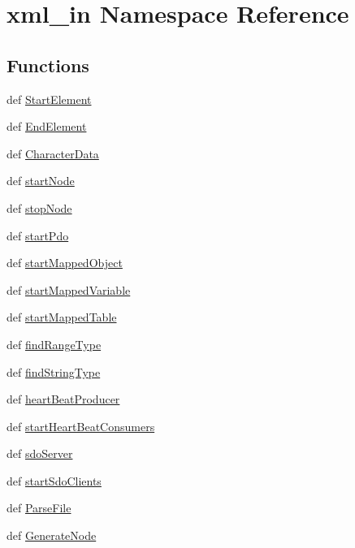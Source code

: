 \hypertarget{namespacexml__in}{
\section{xml\_\-in Namespace Reference}
\label{namespacexml__in}
}


\subsection*{Functions}
\begin{CompactItemize}
\item 
def \hyperlink{namespacexml__in_3b1b832c9581208c332a83f106015aff}{Start\-Element}
\item 
def \hyperlink{namespacexml__in_152ef8abb29428e5a4f6883d0b9c1036}{End\-Element}
\item 
def \hyperlink{namespacexml__in_40875b2bc42a3db80aaedc214f8da3d7}{Character\-Data}
\item 
def \hyperlink{namespacexml__in_170b4feee4419d719dec07845bd6f591}{start\-Node}
\item 
def \hyperlink{namespacexml__in_14f6a38437b8d44f75a7838414f926f8}{stop\-Node}
\item 
def \hyperlink{namespacexml__in_05f630ab0531cab1ef4649ca8b6a662f}{start\-Pdo}
\item 
def \hyperlink{namespacexml__in_c590c2898e7e2c81fb741dded42e9139}{start\-Mapped\-Object}
\item 
def \hyperlink{namespacexml__in_df5fbbfd3c5f6bbe0205f2926dc443d1}{start\-Mapped\-Variable}
\item 
def \hyperlink{namespacexml__in_cab6ba5f6bd741bbe97aa9d1af78194f}{start\-Mapped\-Table}
\item 
def \hyperlink{namespacexml__in_826fcdb3b500cd56bccd4290f39397d9}{find\-Range\-Type}
\item 
def \hyperlink{namespacexml__in_7f11bfdc69b5c39650c9edf1ab83b08b}{find\-String\-Type}
\item 
def \hyperlink{namespacexml__in_9ef42f4525a33b7fad6bf277f5f90e8b}{heart\-Beat\-Producer}
\item 
def \hyperlink{namespacexml__in_a29dbd3a28381042f0922702dd79eb8a}{start\-Heart\-Beat\-Consumers}
\item 
def \hyperlink{namespacexml__in_c5e8bc321d2c732d14dbfcaddc330462}{sdo\-Server}
\item 
def \hyperlink{namespacexml__in_3f4a758fcb8c3ffea6e7439f30ccf0fb}{start\-Sdo\-Clients}
\item 
def \hyperlink{namespacexml__in_5e641408753c70e0423471a1b4861ec5}{Parse\-File}
\item 
def \hyperlink{namespacexml__in_5a1a1b6e0ee2c4143195f17ebc6e5d62}{Generate\-Node}
\end{CompactItemize}


